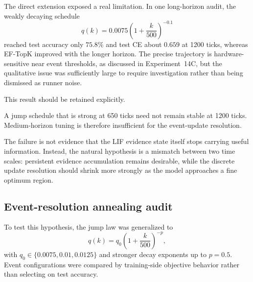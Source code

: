 The direct extension exposed a real limitation. In one long-horizon audit, the weakly decaying schedule
\begin{equation}
q(k)=0.0075\left(1+\frac{k}{500}\right)^{-0.1}
\end{equation}
reached test accuracy only $75.8\%$ and test CE about $0.659$ at 1200 ticks, whereas EF-TopK improved with the longer horizon. The precise trajectory is hardware-sensitive near event thresholds, as discussed in Experiment~14C, but the qualitative issue was sufficiently large to require investigation rather than being dismissed as runner noise.

This result should be retained explicitly.
\begin{takeawaybox}[title={Experiment 15A negative result}]
A jump schedule that is strong at 650 ticks need not remain stable at 1200 ticks. Medium-horizon tuning is therefore insufficient for the event-update resolution.
\end{takeawaybox}
The failure is not evidence that the LIF evidence state itself stops carrying useful information. Instead, the natural hypothesis is a mismatch between two time scales: persistent evidence accumulation remains desirable, while the discrete update resolution should shrink more strongly as the model approaches a fine optimum region.

\subsection{Event-resolution annealing audit}

To test this hypothesis, the jump law was generalized to
\begin{equation}
q(k)=q_0\left(1+\frac{k}{500}\right)^{-p},
\end{equation}
with $q_0\in\{0.0075,0.01,0.0125\}$ and stronger decay exponents up to $p=0.5$. Event configurations were compared by training-side objective behavior rather than selecting on test accuracy.

